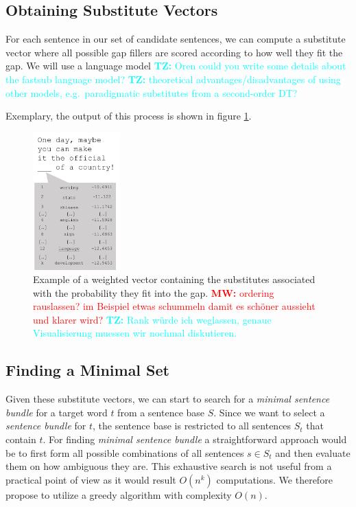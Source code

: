 \documentclass[11pt,letterpaper]{article}
\newcommand{\tz}[1]{\textcolor{cyan}{\textbf{TZ:} #1}}
\newcommand{\mw}[1]{\textcolor{red}{\textbf{MW:} #1}}
\newcommand{\tz}[1]{}
\newcommand{\mw}[1]{}
\begin{document}

\subsection{Obtaining Substitute Vectors}


For each sentence in our set of candidate sentences, we can compute a substitute vector where all possible gap fillers are scored according to how well they fit the gap.
We will use a language model
\tz{Oren could you write some details about the fastsub language model?}
\tz{theoretical advantages/disadvantages of using other models, e.g.\ paradigmatic substitutes from a second-order DT?}

Exemplary, the output of this process is shown in figure \ref{fig:mostProbableVector}.
\begin{figure}
	\centering
  		\includegraphics[width=0.3\textwidth]{figures/example_most_probableVector.png}
  		\caption{Example of a weighted vector containing the substitutes associated with the probability they fit into the gap.  \mw{ordering rauslassen? im Beispiel etwas schummeln damit es schöner aussieht und klarer wird?} \tz{Rank würde ich weglassen, genaue Visualisierung muessen wir nochmal diskutieren.}}
  		\label{fig:mostProbableVector}
\end{figure}

\subsection{Finding a Minimal Set}
Given these substitute vectors, we can start to search for a \textit{minimal sentence bundle} for a target word $t$ from a sentence base $S$.
Since we want to select a \textit{sentence bundle} for $t$, the sentence base is restricted to all sentences $S_t$ that contain $t$.
For finding \textit{minimal sentence bundle} a straightforward approach would be to first form all possible combinations of all sentences $s \in S_t$ and then evaluate them on how ambiguous they are.
This exhaustive search is not useful from a practical point of view as it would result $O(n^k)$ computations.
We therefore propose to utilize a greedy algorithm with complexity $O(n)$.
\end{document}
